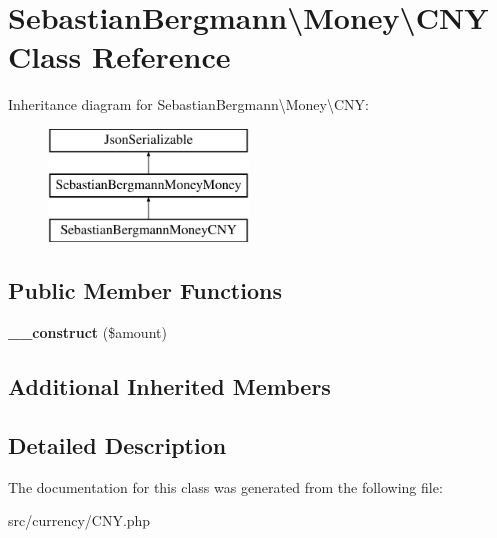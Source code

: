 \hypertarget{classSebastianBergmann_1_1Money_1_1CNY}{}\section{Sebastian\+Bergmann\textbackslash{}Money\textbackslash{}C\+N\+Y Class Reference}
\label{classSebastianBergmann_1_1Money_1_1CNY}
Inheritance diagram for Sebastian\+Bergmann\textbackslash{}Money\textbackslash{}C\+N\+Y\+:\begin{figure}[H]
\begin{center}
\leavevmode
\includegraphics[height=3.000000cm]{classSebastianBergmann_1_1Money_1_1CNY}
\end{center}
\end{figure}
\subsection*{Public Member Functions}
\begin{DoxyCompactItemize}
\item 
\hypertarget{classSebastianBergmann_1_1Money_1_1CNY_a64d521b6a3a2989655ed50db8f1cbbbf}{}{\bfseries \+\_\+\+\_\+construct} (\$amount)\label{classSebastianBergmann_1_1Money_1_1CNY_a64d521b6a3a2989655ed50db8f1cbbbf}

\end{DoxyCompactItemize}
\subsection*{Additional Inherited Members}


\subsection{Detailed Description}


The documentation for this class was generated from the following file\+:\begin{DoxyCompactItemize}
\item 
src/currency/C\+N\+Y.\+php\end{DoxyCompactItemize}
